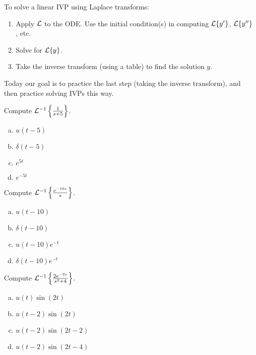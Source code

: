 \begin{applicationActivities}

\begin{observation}
To solve a linear IVP using Laplace transforms:
\begin{enumerate}[1)]
\item Apply \(\mathcal{L}\) to the ODE.  Use the initial condition(s) in computing \(\mathcal{L}\{y'\}\), \(\mathcal{L}\{y''\}\), etc.
\item Solve for \(\mathcal{L}\{y\}\).
\item Take the inverse transform (using a table) to find the solution \(y\).
\end{enumerate}
\vfill
Today our goal is to practice the last step (taking the inverse transform), and then practice solving IVPs this way. 
\end{observation}

\begin{activity}{5}
Compute \(\mathcal{L}^{-1} \left\{ \frac{1}{s+5}\right\} \).
\begin{enumerate}[(a)]
\item \(u(t-5)\)
\item \(\delta(t-5)\)
\item \(e^{5t}\)
\item \(e^{-5t}\)
\end{enumerate}
\end{activity}

\begin{activity}{5}
Compute \(\mathcal{L}^{-1} \left\{ \frac{e^{-10s}}{s}\right\} \).
\begin{enumerate}[(a)]
\item \(u(t-10)\)
\item \(\delta(t-10)\)
\item \(u(t-10)e^{-t}\)
\item \(\delta(t-10)e^{-t}\)
\end{enumerate}
\end{activity}




\begin{activity}{5}
Compute \(\mathcal{L}^{-1}\left\{\frac{2e^{-2s}}{s^2+4}\right\} \).
\begin{enumerate}[(a)]
\item \(u(t)\sin(2t)\)
\item \(u(t-2)\sin(2t)\)
\item \(u(t-2)\sin(2t-2)\)
\item \(u(t-2)\sin(2t-4)\)
\end{enumerate}
\end{activity}


\end{applicationActivities}
